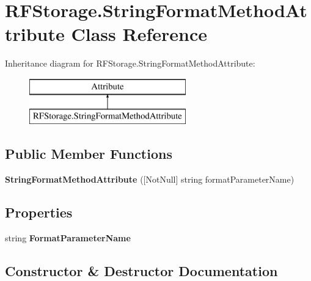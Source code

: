 \section{R\+F\+Storage.\+String\+Format\+Method\+Attribute Class Reference}
\label{class_r_f_storage_1_1_string_format_method_attribute}
Inheritance diagram for R\+F\+Storage.\+String\+Format\+Method\+Attribute\+:\begin{figure}[H]
\begin{center}
\leavevmode
\includegraphics[height=2.000000cm]{class_r_f_storage_1_1_string_format_method_attribute}
\end{center}
\end{figure}
\subsection*{Public Member Functions}
\begin{DoxyCompactItemize}
\item 
\textbf{ String\+Format\+Method\+Attribute} ([Not\+Null] string format\+Parameter\+Name)
\end{DoxyCompactItemize}
\subsection*{Properties}
\begin{DoxyCompactItemize}
\item 
\mbox{\label{class_r_f_storage_1_1_string_format_method_attribute_a4549cf506d7a4ee66d169ec7bfac8a28}} 
string {\bfseries Format\+Parameter\+Name}\hspace{0.3cm}{\ttfamily  [get]}
\end{DoxyCompactItemize}


\subsection{Constructor \& Destructor Documentation}
\mbox{\label{class_r_f_storage_1_1_string_format_method_attribute_a363c664ef453ba5ff56ee41cb3e1ce3b}} 
